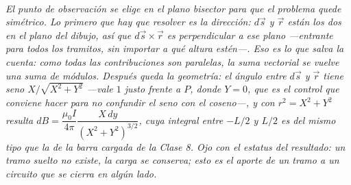 \begin{center}
\begin{tikzpicture}[scale=1]
\end{tikzpicture}\\[0.5em]
{\small\itshape El punto de observación se elige en el plano bisector para que
el problema quede simétrico. Lo primero que hay que resolver es la dirección:
$d\vec s$ y $\vec r$ están los dos en el plano del dibujo, así que
$d\vec s\times\vec r$ es perpendicular a ese plano ---entrante para todos los
tramitos, sin importar a qué altura estén---. Eso es lo que salva la cuenta:
como todas las contribuciones son paralelas, la suma vectorial se vuelve una
suma de módulos. Después queda la geometría: el ángulo entre $d\vec s$ y
$\vec r$ tiene seno $X/\sqrt{X^2+Y^2}$ ---vale $1$ justo frente a $P$, donde
$Y=0$, que es el control que conviene hacer para no confundir el seno con el
coseno---, y con $r^2=X^2+Y^2$ resulta
$dB = \dfrac{\mu_0 I}{4\pi}\dfrac{X\,dy}{(X^2+Y^2)^{3/2}}$, cuya integral entre
$-L/2$ y $L/2$ es del mismo tipo que la de la barra cargada de la Clase 8.
Ojo con el estatus del resultado: un tramo suelto no existe, la carga se
conserva; esto es el aporte de un tramo a un circuito que se cierra en algún
lado.}
\end{center}
